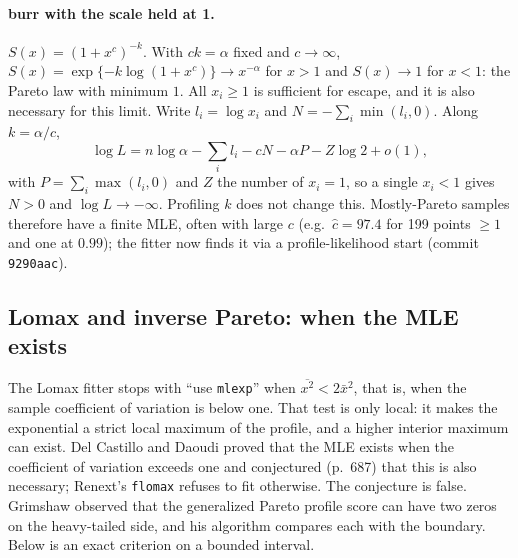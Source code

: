 \documentclass[11pt]{article}
\newcommand{\code}[1]{\texttt{#1}}
\theoremstyle{plain}
\theoremstyle{definition}
\theoremstyle{remark}
\begin{document}
\paragraph{burr with the scale held at 1.} $S(x) = (1+x^c)^{-k}$. With
$ck = \alpha$ fixed and $c\to\infty$, $S(x) = \exp\{-k\log(1+x^c)\} \to
x^{-\alpha}$ for $x>1$ and $S(x)\to 1$ for $x<1$: the Pareto law with
minimum $1$. All $x_i \ge 1$ is sufficient for escape, and it is also
necessary for this limit. Write $l_i = \log x_i$ and
$N = -\sum_i \min(l_i, 0)$. Along $k = \alpha/c$,
\[
  \log L = n\log\alpha - \textstyle\sum_i l_i - cN - \alpha P - Z\log 2 + o(1),
\]
with $P = \sum_i \max(l_i,0)$ and $Z$ the number of $x_i = 1$, so a single
$x_i < 1$ gives $N > 0$ and $\log L \to -\infty$. Profiling $k$ does not
change this. Mostly-Pareto samples therefore have a finite MLE, often with
large $c$ (e.g.\ $\hat c = 97.4$ for 199 points $\ge 1$ and one at $0.99$);
the fitter now finds it via a profile-likelihood start (commit
\code{9290aac}).

\subsection{Lomax and inverse Pareto: when the MLE exists}\label{sec:lomax}


The Lomax fitter stops with ``use \code{mlexp}'' when
$\overline{x^2} < 2\bar x^2$, that is, when the sample coefficient of
variation is below one. That test is only local: it makes the exponential a
strict local maximum of the profile, and a higher interior maximum can
exist. Del Castillo and Daoudi \cite{delcastillo2009} proved that the MLE exists when the
coefficient of variation exceeds one and conjectured (p.~687) that this is
also necessary; Renext's \code{flomax} \cite{renext} refuses to fit
otherwise. The conjecture is false. Grimshaw \cite{grimshaw1993} observed that the
generalized Pareto profile score can have two zeros on the heavy-tailed side,
and his algorithm compares each with the boundary. Below is an exact
criterion on a bounded interval.
\end{document}
